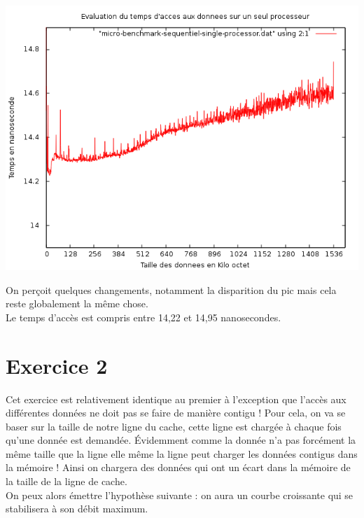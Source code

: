 \documentclass[11pt,a4paper]{article}
\begin{document}
\begin{center}
\includegraphics[keepaspectratio=true,width=\linewidth]{Exercice1/micro-benchmark-sequentiel-single-processor.png}
\end{center}
On perçoit quelques changements, notamment la disparition du pic mais cela reste globalement la même chose.\\
Le temps d'accès est compris entre 14,22 et 14,95 nanosecondes.

\pagebreak
\section{Exercice 2}

Cet exercice est relativement identique au premier à l'exception que l'accès aux différentes données ne doit pas se faire de manière contigu ! Pour cela, on va se baser sur la taille de notre ligne du cache, cette ligne est chargée à chaque fois qu'une donnée est demandée. Évidemment comme la donnée n'a pas forcément la même taille que la ligne elle même la ligne peut charger les données contigus dans la mémoire ! Ainsi on chargera des données qui ont un écart dans la mémoire de la taille de la ligne de cache.\\
On peux alors émettre l'hypothèse suivante : on aura un courbe croissante qui se stabilisera à son débit maximum.
\end{document}

